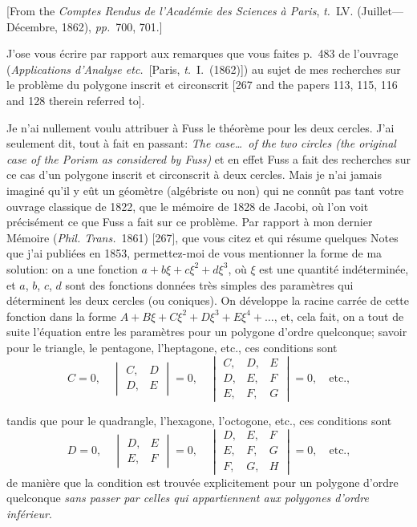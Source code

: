\documentclass[11pt,a4paper]{article}
\newcommand{\tome}{\textit{t.}}
\newcommand{\pages}{\textit{pp.}}
\begin{document}
[From the \textit{Comptes Rendus de l'Acad\'{e}mie des Sciences \`{a} Paris}, \tome~LV. (Juillet---D\'{e}cembre, 1862), \pages~700, 701.]

\medskip

J'ose vous \'{e}crire par rapport aux remarques que vous faites p.~483 de l'ouvrage (\textit{Applications d'Analyse etc.}\ [Paris, \tome~I.\ (1862)]) au sujet de mes recherches sur le probl\`{e}me du polygone inscrit et circonscrit [267 and the papers 113, 115, 116 and 128 therein referred to].

Je n'ai nullement voulu attribuer \`{a} Fuss le th\'{e}or\`{e}me pour les deux cercles. J'ai seulement dit, tout \`{a} fait en passant: \textit{The case\ldots\ of the two circles (the original case of the Porism as considered by Fuss)} et en effet Fuss a fait des recherches sur ce cas d'un polygone inscrit et circonscrit \`{a} deux cercles. Mais je n'ai jamais imagin\'{e} qu'il y e\^{u}t un g\'{e}om\`{e}tre (alg\'{e}briste ou non) qui ne conn\^{u}t pas tant votre ouvrage classique de 1822, que le m\'{e}moire de 1828 de Jacobi, o\`{u} l'on voit pr\'{e}cis\'{e}ment ce que Fuss a fait sur ce probl\`{e}me. Par rapport \`{a} mon dernier M\'{e}moire (\textit{Phil. Trans.}\ 1861) [267], que vous citez et qui r\'{e}sume quelques Notes que j'ai publi\'{e}es en 1853, permettez-moi de vous mentionner la forme de ma solution: on a une fonction $a + b\xi + c\xi^2 + d\xi^3$, o\`{u} $\xi$ est une quantit\'{e} ind\'{e}termin\'{e}e, et $a$, $b$, $c$, $d$ sont des fonctions donn\'{e}es tr\`{e}s simples des param\`{e}tres qui d\'{e}terminent les deux cercles (ou coniques). On d\'{e}veloppe la racine carr\'{e}e de cette fonction dans la forme $A + B\xi + C\xi^2 + D\xi^3 + E\xi^4 + \ldots$, et, cela fait, on a tout de suite l'\'{e}quation entre les param\`{e}tres pour un polygone d'ordre quelconque; savoir pour le triangle, le pentagone, l'heptagone, etc., ces conditions sont
\[
C = 0, \quad
\begin{vmatrix} C, & D \\ D, & E \end{vmatrix} = 0, \quad
\begin{vmatrix} C, & D, & E \\ D, & E, & F \\ E, & F, & G \end{vmatrix} = 0, \quad \text{etc.,}
\]

\clearpage

tandis que pour le quadrangle, l'hexagone, l'octogone, etc., ces conditions sont
\[
D = 0, \quad
\begin{vmatrix} D, & E \\ E, & F \end{vmatrix} = 0, \quad
\begin{vmatrix} D, & E, & F \\ E, & F, & G \\ F, & G, & H \end{vmatrix} = 0, \quad \text{etc.,}
\]
de mani\`{e}re que la condition est trouv\'{e}e explicitement pour un polygone d'ordre quelconque \textit{sans passer par celles qui appartiennent aux polygones d'ordre inf\'{e}rieur}.
\end{document}
